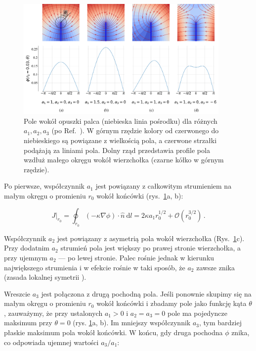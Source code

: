 \documentclass[]{pracamgr}
\begin{document}
    \begin{figure}[H]
      \centering
      \includegraphics[width=0.93\textwidth]{figs/grid_potential_python.png}
      \vspace{0pt}
      \caption {Pole wokół opuszki palca (niebieska linia pośrodku) dla różnych $a_1, a_2, a_3$ (po Ref.~\cite{petroff2013bifurcation}). W górnym rzędzie kolory od czerwonego do niebieskiego są powiązane z wielkością pola, a czerwone strzałki podążają za liniami pola. Dolny rząd przedstawia profile pola wzdłuż małego okręgu wokół wierzchołka (czarne kółko w górnym rzędzie).}
      \label{grid_pot}
    \end{figure}

    Po pierwsze, współczynnik $a_1$ jest powiązany z całkowitym strumieniem na małym okręgu o promieniu $r_0$ wokół końcówki (rys.~\ref{grid_pot}a, b):
    
    \begin{equation}\label{circle}
      J|_{r_0} = \oint_{r_0} (-\kappa \nabla \phi) \cdot \hat{n} \ \textrm{d}l = 2 \kappa a_1 r_0^{1/2} + \mathcal{O}\left(r_0^{3/2}\right) \,.
    \end{equation}

    Współczynnik $a_2$ jest powiązany z asymetrią pola wokół wierzchołka (Rys.~\ref{grid_pot}c). Przy dodatnim $a_2$ strumień pola jest większy po prawej stronie wierzchołka, a przy ujemnym $a_2$ — po lewej stronie. Palec rośnie jednak w kierunku największego strumienia i w efekcie rośnie w taki sposób, że $a_2$ zawsze znika (zasada lokalnej symetrii \cite{cohen2015path}).
    
    Wreszcie $a_3$ jest połączona z drugą pochodną pola. Jeśli ponownie skupimy się na małym okręgu o promieniu $r_0$ wokół końcówki i zbadamy pole jako funkcję kąta $\theta$, zauważymy, że przy ustalonych $a_1>0$ i $a_2=a_3=0$ pole ma pojedyncze maksimum przy $\theta = 0$ (rys. \ref{grid_pot}a, b). Im mniejszy współczynnik $a_3$, tym bardziej płaskie maksimum pola wokół końcówki. W końcu, gdy druga pochodna $\phi$ znika, co odpowiada ujemnej wartości $a_3/a_1$:
    
\end{document}
